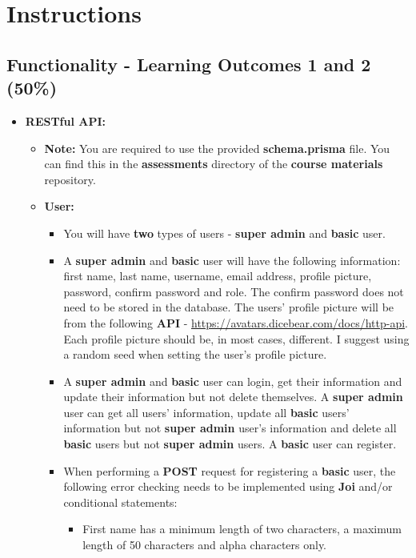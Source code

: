 \documentclass{article}
\begin{document}
\section*{Instructions}

\subsection*{Functionality - Learning Outcomes 1 and 2 (50\%)}
\begin{itemize} 

\item \textbf{RESTful API:}
	\begin{itemize}
		\item \textbf{Note:} You are required to use the provided \textbf{schema.prisma} file. You can find this in the \textbf{assessments} directory of the \textbf{course materials} repository.
		\item \textbf{User:}
		\begin{itemize}
			\item You will have \textbf{two} types of users - \textbf{super admin} and \textbf{basic} user.
			\item A \textbf{super admin} and \textbf{basic} user will have the following information: first name, last name, username, email address, profile picture, password, confirm password and role. The confirm password does not need to be stored in the database. The users' profile picture will be from the following \textbf{API} - \href{https://avatars.dicebear.com/docs/http-api}{https://avatars.dicebear.com/docs/http-api}. Each profile picture should be, in most cases, different. I suggest using a random seed when setting the user's profile picture.
			\item A \textbf{super admin} and \textbf{basic} user can login, get their information and update their information but not delete themselves. A \textbf{super admin} user can get all users' information, update all \textbf{basic} users' information but not \textbf{super admin} user's information and delete all \textbf{basic} users but not \textbf{super admin} users. A \textbf{basic} user can register.
			\item When performing a \textbf{POST} request for registering a \textbf{basic} user, the following error checking needs to be implemented using \textbf{Joi} and/or conditional statements:
			\begin{itemize}
				\item First name has a minimum length of two characters, a maximum length of 50 characters and alpha characters only.

\end{itemize}
\end{itemize}
\end{itemize}
\end{itemize}
\end{document}
